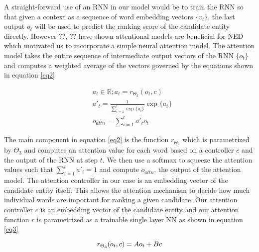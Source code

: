 \documentclass[11pt]{article}
\begin{document}
	A straight-forward use of an RNN in our model would be to train the RNN so that given a context as a sequence of word embedding vectors $\{v_t\}$, the last output $o_t$ will be used to predict the ranking score of the candidate entity directly. However ??, ?? have shown attentional models are beneficial for NED which motivated us to incorporate a simple neural attention model. The attention model takes the entire sequence of intermediate output vectors of the RNN $\{o_t\}$ and computes a weighted average of the vectors governed by the equations shown in equation \ref{eq2}
	
	\begin{equation}
	\label{eq2}
	\begin{aligned}
	& a_t \in \mathbb{R}; a_t=r_{\Theta_3}(o_t, c) \\
	& a'_t  = \frac{1}{\sum_{i=1}^{t} \exp\{a_i\}} \exp \{a_t\} \\
	& o_{attn}=\sum_{i=1}^{t} a'_t o_t
	\end{aligned}
	\end{equation}
	
	The main component in equation \ref{eq2} is the function $r_{\Theta_3}$ which is parametrized by $\Theta_3$ and computes an attention value for each word based on a controller $c$ and the output of the RNN at step $t$. We then use a softmax to squeeze the attention values such that $\sum_{i=1}^{t} a'_i = 1$ and compute $o_{attn}$, the output of the attention model. The attention controller in our case is an embedding vector of the candidate entity itself. This allows the attention mechanism to decide how much individual words are important for ranking a given candidate. Our attention controller $c$ is an embedding vector of the candidate entity and our attention function $r$ is parametrized as a trainable single layer NN as shown in equation \ref{eq3}
	
	\begin{equation}
	\label{eq3}
	r_{\Theta_3}(o_t, c) = Ao_t + Bc \\
	\end{equation}
	
\end{document}
